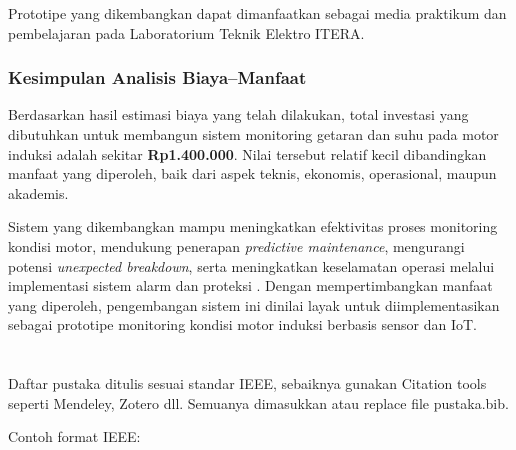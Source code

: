\documentclass{elsinta}
\begin{document}
Prototipe yang dikembangkan dapat dimanfaatkan sebagai media praktikum dan pembelajaran pada Laboratorium Teknik Elektro ITERA.

\subsubsection{Kesimpulan Analisis Biaya--Manfaat}

Berdasarkan hasil estimasi biaya yang telah dilakukan, total investasi yang dibutuhkan untuk membangun sistem monitoring getaran dan suhu pada motor induksi adalah sekitar \textbf{Rp1.400.000}. Nilai tersebut relatif kecil dibandingkan manfaat yang diperoleh, baik dari aspek teknis, ekonomis, operasional, maupun akademis.

Sistem yang dikembangkan mampu meningkatkan efektivitas proses monitoring kondisi motor, mendukung penerapan \textit{predictive maintenance}, mengurangi potensi \textit{unexpected breakdown}, serta meningkatkan keselamatan operasi melalui implementasi sistem alarm dan proteksi \cite{jardine2006,randall2011}. Dengan mempertimbangkan manfaat yang diperoleh, pengembangan sistem ini dinilai layak untuk diimplementasikan sebagai prototipe monitoring kondisi motor induksi berbasis sensor dan IoT.


\section{\ReferencesTitle}
Daftar pustaka ditulis sesuai standar IEEE, sebaiknya gunakan Citation tools seperti Mendeley, Zotero dll. Semuanya dimasukkan atau replace file pustaka.bib.

Contoh format IEEE:  
\renewcommand{\refname}{}      %




\section{\AbbrevTitle}
\end{document}
